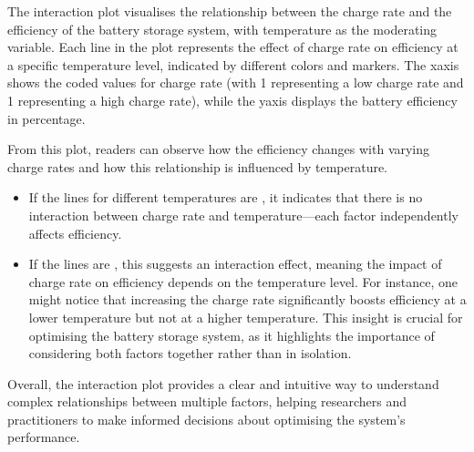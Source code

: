 \documentclass[letterpaper,10pt,english]{jupyterBook}
\begin{document}
\sphinxAtStartPar
The interaction plot visualises the relationship between the charge rate and the efficiency of the battery storage system, with temperature as the moderating variable. Each line in the plot represents the effect of charge rate on efficiency at a specific temperature level, indicated by different colors and markers. The x\sphinxhyphen{}axis shows the coded values for charge rate (with \sphinxhyphen{}1 representing a low charge rate and 1 representing a high charge rate), while the y\sphinxhyphen{}axis displays the battery efficiency in percentage.

\sphinxAtStartPar
From this plot, readers can observe how the efficiency changes with varying charge rates and how this relationship is influenced by temperature.
\begin{itemize}
\item {} 
\sphinxAtStartPar
If the lines for different temperatures are , it indicates that there is no interaction between charge rate and temperature—each factor independently affects efficiency.

\item {} 
\sphinxAtStartPar
If the lines are , this suggests an interaction effect, meaning the impact of charge rate on efficiency depends on the temperature level. For instance, one might notice that increasing the charge rate significantly boosts efficiency at a lower temperature but not at a higher temperature. This insight is crucial for optimising the battery storage system, as it highlights the importance of considering both factors together rather than in isolation.

\end{itemize}

\sphinxAtStartPar
Overall, the interaction plot provides a clear and intuitive way to understand complex relationships between multiple factors, helping researchers and practitioners to make informed decisions about optimising the system’s performance.
\end{document}
